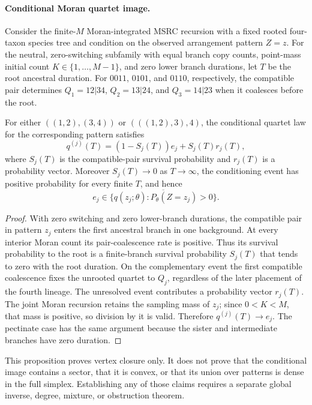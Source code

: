 \paragraph{Conditional Moran quartet image.}
Consider the finite-$M$ Moran-integrated MSRC recursion with a fixed rooted
four-taxon species tree and condition on the observed arrangement pattern
$Z=z$. For the neutral, zero-switching subfamily with equal branch copy
counts, point-mass initial count $K\in\{1,\ldots,M-1\}$, and zero lower
branch durations, let $T$ be the root ancestral duration. For
$0011$, $0101$, and $0110$, respectively, the compatible pair determines
$Q_1=12|34$, $Q_2=13|24$, and $Q_3=14|23$ when it coalesces before the root.

\begin{proposition}
For either $((1,2),(3,4))$ or $(((1,2),3),4)$, the conditional quartet law
for the corresponding pattern satisfies
\[
q^{(j)}(T)=(1-S_j(T))e_j+S_j(T)r_j(T),
\]
where $S_j(T)$ is the compatible-pair survival probability and $r_j(T)$ is a
probability vector. Moreover $S_j(T)\to0$ as $T\to\infty$, the conditioning
event has positive probability for every finite $T$, and hence
\[
e_j\in\overline{\{q(z_j;\theta):P_\theta(Z=z_j)>0\}}.
\]
\end{proposition}

\begin{proof}
With zero switching and zero lower-branch durations, the compatible pair in
pattern $z_j$ enters the first ancestral branch in one background. At every
interior Moran count its pair-coalescence rate is positive. Thus its survival
probability to the root is a finite-branch survival probability $S_j(T)$
that tends to zero with the root duration. On the complementary event the
first compatible coalescence fixes the unrooted quartet to $Q_j$, regardless
of the later placement of the fourth lineage. The unresolved event contributes
a probability vector $r_j(T)$. The joint Moran recursion retains the sampling
mass of $z_j$; since $0<K<M$, that mass is positive, so division by it is
valid. Therefore $q^{(j)}(T)\to e_j$. The pectinate case has the same
argument because the sister and intermediate branches have zero duration.
\end{proof}

This proposition proves vertex closure only. It does not prove that the
conditional image contains a sector, that it is convex, or that its union
over patterns is dense in the full simplex. Establishing any of those claims
requires a separate global inverse, degree, mixture, or obstruction theorem.
